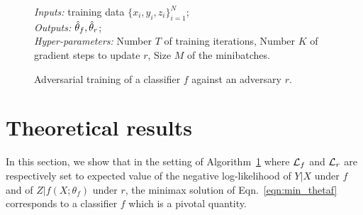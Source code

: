\documentclass{article}
\theoremstyle{plain}
\begin{document}
\begin{figure}
    \begin{minipage}{\linewidth}
    \begin{algorithm}[H]
    \caption{Adversarial training of a classifier $f$ against an adversary $r$.}

    \begin{flushleft}
        {\it Inputs:} training data $\{ x_i, y_i, z_i \}_{i=1}^N$;\\
        {\it Outputs:} $\smash{\hat\theta_f}, \smash{\hat\theta_r}$;\\
        {\it Hyper-parameters:} Number $T$ of training iterations,
                                Number $K$ of gradient steps to update $r$,
                                Size $M$ of the minibatches.
    \end{flushleft}

    \label{alg:adversarial-training}
    \begin{algorithmic}[1]
            \ENDFOR
        \ENDFOR
    \end{algorithmic}
    \end{algorithm}
    \end{minipage}
\end{figure}



\section{Theoretical results}
\label{sec:theory}

In this section, we show that in the setting of
Algorithm~\ref{alg:adversarial-training} where ${\cal L}_f$ and ${\cal L}_r$ are
respectively set to expected value of the negative log-likelihood of $Y|X$ under
$f$ and of $Z|f(X;\theta_f)$ under $r$, the minimax solution of Eqn.~\ref{eqn:min_thetaf}
corresponds to a classifier
$f$ which is a pivotal quantity.
\end{document}
